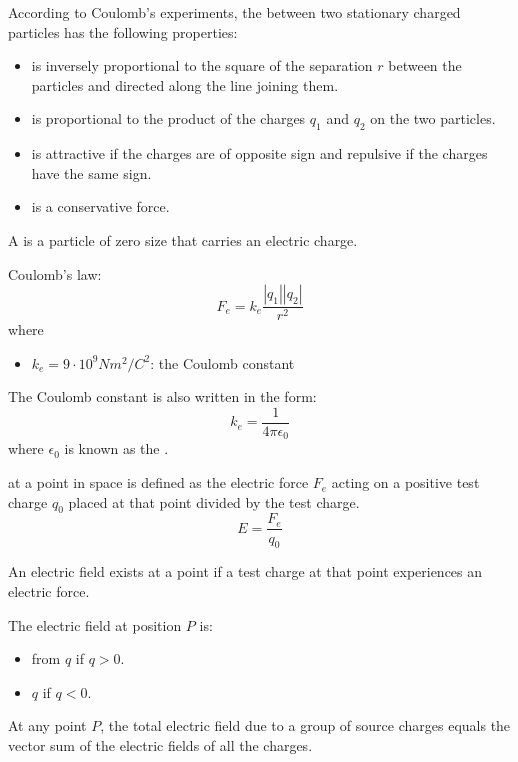     \par According to Coulomb's experiments, the  between two stationary
    charged particles has the following properties:
    \begin{itemize}
        \item is inversely proportional to the square of the separation $r$ between the particles
            and directed along the line joining them.
        \item is proportional to the product of the charges $q_{1}$ and $q_{2}$ on the two
            particles.
        \item is attractive if the charges are of opposite sign and repulsive if the charges have
            the same sign.
        \item is a conservative force.
    \end{itemize}
    \par A  is a particle of zero size that carries an electric charge.
    \par Coulomb's law:
    \begin{equation}
        F_{e} = k_{e} \frac{|q_{1}||q_{2}|}{r^{2}}
    \end{equation}
    where
    \begin{itemize}
        \item $k_{e} = 9 \cdot 10^{9} Nm^{2}/C^{2}$: the Coulomb constant
    \end{itemize}
    \par The Coulomb constant is also written in the form:
    \begin{equation}
        k_{e} = \frac{1}{4 \pi \epsilon_{0}}
    \end{equation}
    where $\epsilon_{0}$ is known as the .

        \par {} at a point in space is defined as the electric
        force $F_{e}$ acting on a positive test charge $q_{0}$ placed at that point divided by
        the test charge.
        \begin{equation}
            E = \frac{F_{e}}{q_{0}}
        \end{equation}
        \par An electric field exists at a point if a test charge at that point experiences an
        electric force.
        \par The electric field at position $P$ is:
        \begin{itemize}
            \item {} from $q$ if $q > 0$.
            \item {} $q$ if $q < 0$.
        \end{itemize}
        \par At any point $P$, the total electric field due to a group of source charges equals the
        vector sum of the electric fields of all the charges.

